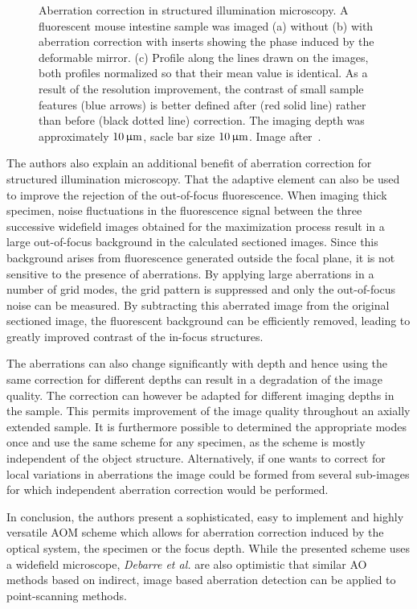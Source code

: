 \begin{figure}[htb]
        \caption{Aberration correction in structured illumination microscopy. A fluorescent mouse intestine sample was imaged (a) without (b) with aberration correction with inserts showing the phase induced by the deformable mirror. (c) Profile along the lines drawn on the images, both profiles normalized so that their mean value is identical. As a result of the resolution improvement, the contrast of small sample features (blue arrows) is better defined after (red solid line) rather than before (black dotted line) correction. The imaging depth was approximately $\unit[10]{\upmu m}$, sacle bar size $\unit[10]{\upmu m}$. Image after~\cite{wide_AOM_structured_illu}.}
\label{fig:structured_light_correction}
\end{figure} 

The authors also explain an additional benefit of aberration correction for structured illumination microscopy. That the adaptive element can also be used to improve the rejection of the out-of-focus fluorescence. When imaging thick specimen, noise fluctuations in the fluorescence signal between the three successive widefield images obtained for the maximization process result in a large out-of-focus background in the calculated sectioned images. Since this background arises from fluorescence generated outside the focal plane, it is not  sensitive to the presence of aberrations. By applying large aberrations in a number of grid modes, the grid pattern is suppressed and only the out-of-focus noise can be measured. By subtracting this aberrated image from the original sectioned image, the fluorescent background can be efficiently removed, leading to greatly improved contrast of the in-focus structures.

The aberrations can also change significantly with depth and hence using the same correction for different depths can result in a degradation of the image quality.  The correction can however be adapted for different imaging depths in the sample. This permits improvement of the image quality throughout an axially extended sample.
It is furthermore possible to determined the appropriate modes once and use the same scheme for any specimen, as the scheme is mostly independent of the object structure. Alternatively, if one wants to correct for local variations in aberrations the image could be formed from several sub-images for which independent aberration correction would be performed.

In conclusion, the authors present a sophisticated, easy to implement and highly versatile AOM scheme which allows for aberration correction induced by the optical system, the specimen or the focus depth. While the presented scheme uses a widefield microscope, \emph{Debarre et al.} are also optimistic that similar AO methods based on indirect, image based aberration detection can be applied to point-scanning methods. 


